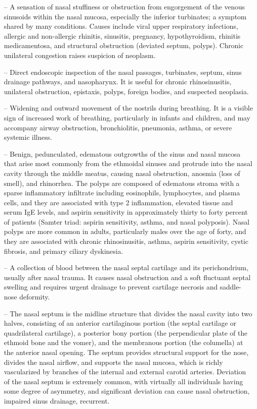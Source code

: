 -- A sensation of nasal stuffiness or obstruction from engorgement of the venous sinusoids within the nasal mucosa, especially the inferior turbinates; a symptom shared by many conditions. Causes include viral upper respiratory infections, allergic and non-allergic rhinitis, sinusitis, pregnancy, hypothyroidism, rhinitis medicamentosa, and structural obstruction (deviated septum, polyps). Chronic unilateral congestion raises suspicion of neoplasm.

-- Direct endoscopic inspection of the nasal passages, turbinates, septum, sinus drainage pathways, and nasopharynx. It is useful for chronic rhinosinusitis, unilateral obstruction, epistaxis, polyps, foreign bodies, and suspected neoplasia.

-- Widening and outward movement of the nostrils during breathing. It is a visible sign of increased work of breathing, particularly in infants and children, and may accompany airway obstruction, bronchiolitis, pneumonia, asthma, or severe systemic illness.

-- Benign, pedunculated, edematous outgrowths of the sinus and nasal mucosa that arise most commonly from the ethmoidal sinuses and protrude into the nasal cavity through the middle meatus, causing nasal obstruction, anosmia (loss of smell), and rhinorrhea. The polyps are composed of edematous stroma with a sparse inflammatory infiltrate including eosinophils, lymphocytes, and plasma cells, and they are associated with type 2 inflammation, elevated tissue and serum IgE levels, and aspirin sensitivity in approximately thirty to forty percent of patients (Samter triad: aspirin sensitivity, asthma, and nasal polyposis). Nasal polyps are more common in adults, particularly males over the age of forty, and they are associated with chronic rhinosinusitis, asthma, aspirin sensitivity, cystic fibrosis, and primary ciliary dyskinesia.

-- A collection of blood between the nasal septal cartilage and its perichondrium, usually after nasal trauma. It causes nasal obstruction and a soft fluctuant septal swelling and requires urgent drainage to prevent cartilage necrosis and saddle-nose deformity.

-- The nasal septum is the midline structure that divides the nasal cavity into two halves, consisting of an anterior cartilaginous portion (the septal cartilage or quadrilateral cartilage), a posterior bony portion (the perpendicular plate of the ethmoid bone and the vomer), and the membranous portion (the columella) at the anterior nasal opening. The septum provides structural support for the nose, divides the nasal airflow, and supports the nasal mucosa, which is richly vascularized by branches of the internal and external carotid arteries. Deviation of the nasal septum is extremely common, with virtually all individuals having some degree of asymmetry, and significant deviation can cause nasal obstruction, impaired sinus drainage, recurrent.

